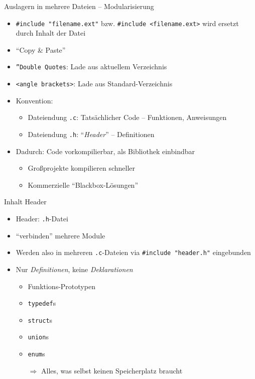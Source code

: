\begin{frame}[fragile]{Auslagern in mehrere Dateien -- Modularisierung}
%
\begin{itemize}
\item \texttt{#include "filename.ext"} bzw. \texttt{#include <filename.ext>} wird ersetzt
	durch Inhalt der Datei
\item \enquote{Copy \& Paste}
\item \texttt{''Double Quotes}: Lade aus aktuellem Verzeichnis
\item \texttt{<angle brackets>}: Lade aus Standard-Verzeichnis
\item Konvention:
	\begin{itemize}
	\item Dateiendung \texttt{.c}: Tatsächlicher Code -- Funktionen, Anweisungen
	\item Dateiendung \texttt{.h}: \enquote{\emph{Header}} -- Definitionen
	\end{itemize}
\item Dadurch: Code vorkompilierbar, als Bibliothek einbindbar
	\begin{itemize}
	\item Großprojekte kompilieren schneller
	\item Kommerzielle \enquote{Blackbox-Lösungen}
	\end{itemize}
\end{itemize}
%
\end{frame}


\begin{frame}[fragile]{Inhalt Header}
%
\begin{itemize}
\item Header: \texttt{.h}-Datei
\item \enquote{verbinden} mehrere Module
\item Werden also in mehreren \texttt{.c}-Dateien via \texttt{#include "header.h"} eingebunden
\item Nur \emph{Definitionen}, keine \emph{Deklarationen}
	\begin{itemize}
	\item Funktions-Prototypen
	\item \texttt{typedef}s
	\item \texttt{struct}s
	\item \texttt{union}s
	\item \texttt{enum}s
	\item[$\Rightarrow$] Alles, was selbst keinen Speicherplatz braucht
	\end{itemize}
\end{itemize}
%
\end{frame}


